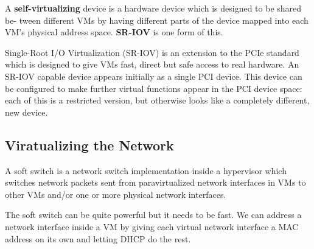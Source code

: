 A \textbf{self-virtualizing} device is a hardware device which is designed to be shared be- tween different VMs by having different parts of the device mapped into each VM’s physical address space. \textbf{SR-IOV} is one form of this. \medskip

Single-Root I/O Virtualization (SR-IOV) is an extension to the PCIe standard which is designed to give VMs fast, direct but safe access to real hardware. An SR-IOV capable device appears initially as a single PCI device. This device can be configured to make further virtual functions appear in the PCI device space: each of this is a restricted version, but otherwise looks like a completely different, new device.


\subsection{Viratualizing the Network}

A soft switch is a network switch implementation inside a hypervisor which switches network packets sent from paravirtualized network interfaces in VMs to other VMs and/or one or more physical network interfaces.\medskip

The soft switch can be quite powerful but it needs to be fast. We can address a network interface inside a VM by giving each virtual network interface a MAC address on its own and letting DHCP do the rest.
